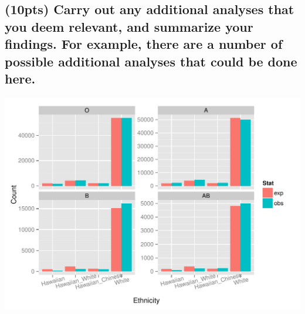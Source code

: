 \documentclass{article}\usepackage[]{graphicx}\usepackage[]{color}
\makeatletter
\def\maxwidth{ %
  \ifdim\Gin@nat@width>\linewidth
    \linewidth
  \else
    \Gin@nat@width
  \fi
}
\newenvironment{knitrout}{}{} %
\makeatother
\begin{document}
\subsection{(10pts) Carry out any additional analyses that you deem relevant, and summarize your findings.
For example, there are a number of possible additional analyses that could be done here.
}
\begin{knitrout}
\color{fgcolor}

{\centering \includegraphics[width=\maxwidth]{figure/5b_table-1} 

}



\end{knitrout}
\end{document}

